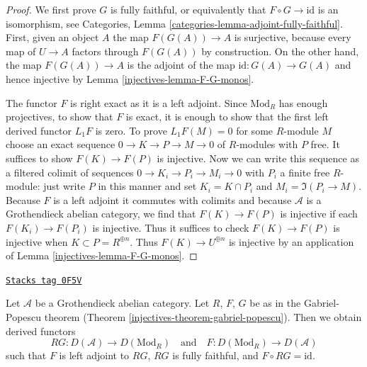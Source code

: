 \begin{proof}

We first prove $G$ is fully faithful, or equivalently that
$F \circ G \to \text{id}$ is an isomorphism, see
Categories, Lemma \ref{categories-lemma-adjoint-fully-faithful}.
First, given an object $A$ the map $F(G(A)) \to A$ is surjective,
because every map of $U \to A$ factors through $F(G(A))$ by construction.
On the other hand, the map $F(G(A)) \to A$ is the adjoint of the
map $\text{id} : G(A) \to G(A)$ and hence injective by
Lemma \ref{injectives-lemma-F-G-monos}.

\medskip\noindent
The functor $F$ is right exact as it is a left adjoint.
Since $\text{Mod}_R$ has enough projectives, to show that
$F$ is exact, it is enough to show that the first left derived
functor $L_1F$ is zero. To prove $L_1F(M) = 0$ for some $R$-module $M$
choose an exact sequence $0 \to K \to P \to M \to 0$
of $R$-modules with $P$ free. It suffices to show $F(K) \to F(P)$
is injective. Now we can write this sequence as a filtered
colimit of sequences $0 \to K_i \to P_i \to M_i \to 0$
with $P_i$ a finite free $R$-module: just write $P$ in this
manner and set $K_i = K \cap P_i$ and $M_i = \Im(P_i \to M)$.
Because $F$ is a left adjoint it commutes
with colimits and because $\mathcal{A}$ is a Grothendieck
abelian category, we find that $F(K) \to F(P)$
is injective if each $F(K_i) \to F(P_i)$ is injective.
Thus it suffices to check $F(K) \to F(P)$
is injective when $K \subset P = R^{\oplus n}$.
Thus $F(K) \to U^{\oplus n}$ is injective by an application
of Lemma \ref{injectives-lemma-F-G-monos}.
\end{proof}

\begin{lemma}
\label{injectives-lemma-gabriel-popescu}
\href{https://stacks.math.columbia.edu/tag/0F5V}{\texttt{Stacks tag 0F5V}}

\begin{reference}
\cite[Corollary 4.1]{serpe}
\end{reference}
Let $\mathcal{A}$ be a Grothendieck abelian category. Let
$R$, $F$, $G$ be as in the Gabriel-Popescu theorem
(Theorem \ref{injectives-theorem-gabriel-popescu}). Then we obtain
derived functors
$$
RG : D(\mathcal{A}) \to D(\text{Mod}_R)
\quad\text{and}\quad
F : D(\text{Mod}_R) \to D(\mathcal{A})
$$
such that $F$ is left adjoint to $RG$, $RG$ is fully faithful,
and $F \circ RG = \text{id}$.
\end{lemma}


